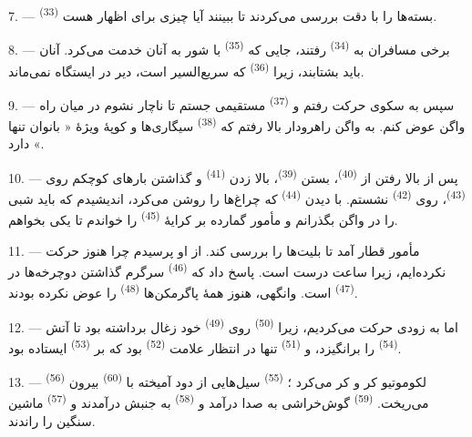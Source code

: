 7. ---  \textsuperscript{(33)} بسته‌ها را با دقت
بررسی می‌کردند تا ببینند آیا چیزی برای اظهار هست.

8. --- برخی مسافران به  \textsuperscript{(34)} رفتند،
جایی که  \textsuperscript{(35)} با شور به آنان خدمت
می‌کرد. آنان باید بشتابند، زیرا  \textsuperscript{(36)}
که سریع‌السیر است، دیر در ایستگاه نمی‌ماند.

9. --- سپس به سکوی حرکت رفتم و  \textsuperscript{(37)}
مستقیمی جستم تا ناچار نشوم در میان راه واگن عوض کنم. به واگن راهرودار
بالا رفتم که  \textsuperscript{(38)} سیگاری‌ها و کوپهٔ
ویژهٔ « بانوان تنها » دارد.

\VUsaut{3.0mm}
\VUsaut{3.0mm}

10. --- پس از بالا رفتن از  \textsuperscript{(40)}، بستن
 \textsuperscript{(39)}، بالا زدن 
\textsuperscript{(41)} و گذاشتن بارهای کوچکم روی 
\textsuperscript{(43)}، روی  \textsuperscript{(42)}
نشستم. با دیدن  \textsuperscript{(44)} که چراغ‌ها را
روشن می‌کرد، اندیشیدم که باید شبی را در واگن بگذرانم و مأمور گمارده
بر کرایهٔ  \textsuperscript{(45)} را خواندم تا یکی
بخواهم.

11. --- مأمور قطار آمد تا بلیت‌ها را بررسی کند. از او پرسیدم چرا هنوز
حرکت نکرده‌ایم، زیرا ساعت درست است. پاسخ داد که 
\textsuperscript{(46)} سرگرم گذاشتن دوچرخه‌ها در 
\textsuperscript{(47)} است. وانگهی، هنوز همهٔ پاگرمکن‌ها
\textsuperscript{(48)} را عوض نکرده بودند.

12. --- اما به زودی حرکت می‌کردیم، زیرا 
\textsuperscript{(50)} روی  \textsuperscript{(49)} خود
زغال برداشته بود تا آتش  \textsuperscript{(54)} را
برانگیزد، و  \textsuperscript{(51)} تنها در انتظار
علامت  \textsuperscript{(52)} بود که بر
 \textsuperscript{(53)} ایستاده بود.

13. ---  \textsuperscript{(56)} لکوموتیو کر و کر
می‌کرد ؛  \textsuperscript{(55)} سیل‌هایی از دود آمیخته
با  \textsuperscript{(60)} بیرون می‌ریخت. 
\textsuperscript{(59)} گوش‌خراشی به صدا درآمد و 
\textsuperscript{(58)} به جنبش درآمدند و 
\textsuperscript{(57)} ماشین سنگین را راندند.

